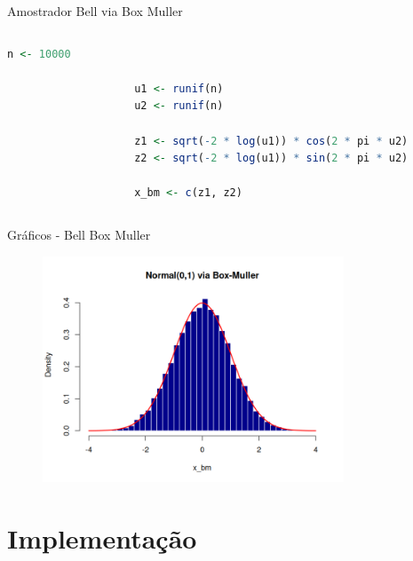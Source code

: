 \documentclass{beamer} %
\begin{document}
	\begin{frame}[fragile]{Amostrador Bell via Box Muller}
		\begin{columns}
			
			\begin{column}{0.85\textwidth}
				\begin{lstlisting}[language=R]
					n <- 10000
					
					u1 <- runif(n)
					u2 <- runif(n)
					
					z1 <- sqrt(-2 * log(u1)) * cos(2 * pi * u2)
					z2 <- sqrt(-2 * log(u1)) * sin(2 * pi * u2)
					
					x_bm <- c(z1, z2)
				\end{lstlisting}
			\end{column}
			
			\begin{column}{0.15\textwidth}
				\href{https://github.com/andresavassi/Trabalho-1---MCCD-II/blob/main/bell_bm.R}{}
				
				\vspace{0.5cm}
				
			\end{column}
			
		\end{columns}
	\end{frame}
	
	\begin{frame}{Gráficos - Bell Box Muller}
		\begin{figure}[h]
			\centering
			\includegraphics[width=0.8\textwidth]{graf_bell_bm.png}
		\end{figure}
	\end{frame}
	

\section{Implementação}
	
\end{document}

